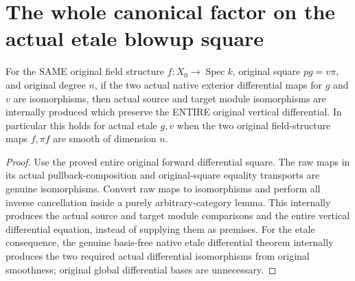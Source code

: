 \section{The whole canonical factor on the actual etale blowup square}

\begin{lemma}
\label{lem:kn-blowup-canonical-etale-square}
\leanok
{}
For the SAME original field structure $f:X_0\to\operatorname{Spec}k$, original square $p g=v\pi$, and original degree $n$, if the two actual native exterior differential maps for $g$ and $v$ are isomorphisms, then actual source and target module isomorphisms are internally produced which preserve the ENTIRE original vertical differential. In particular this holds for actual etale $g,v$ when the two original field-structure maps $f,\pi f$ are smooth of dimension $n$.
\end{lemma}
\begin{proof}
Use the proved entire original forward differential square. The raw maps in its actual pullback-composition and original-square equality transports are genuine isomorphisms. Convert raw maps to isomorphisms and perform all inverse cancellation inside a purely arbitrary-category lemma. This internally produces the actual source and target module comparisons and the entire vertical differential equation, instead of supplying them as premises. For the etale consequence, the genuine basis-free native etale differential theorem internally produces the two required actual differential isomorphisms from original smoothness; original global differential bases are unnecessary.
\end{proof}

